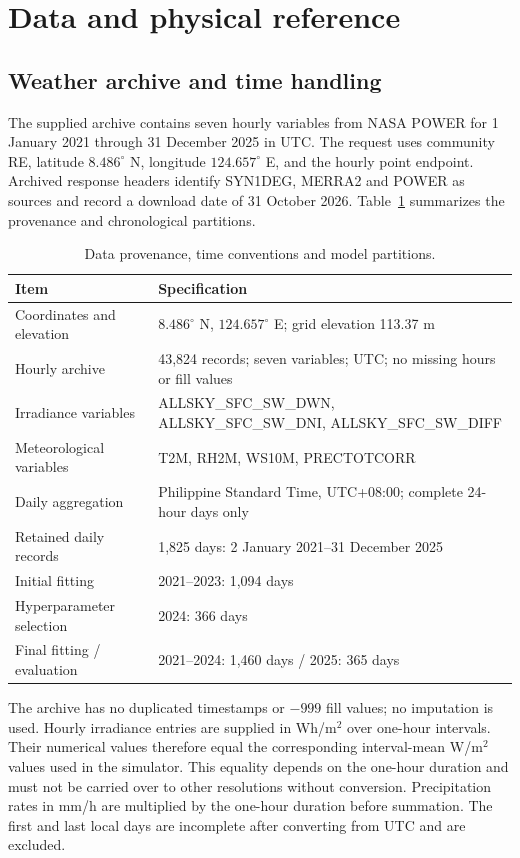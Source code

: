 \documentclass[11pt,a4paper]{article}
\begin{document}
\section{Data and physical reference}
\subsection{Weather archive and time handling}
The supplied archive contains seven hourly variables from NASA POWER for 1 January 2021 through 31 December 2025 in UTC. The request uses community RE, latitude $8.486^{\circ}$ N, longitude $124.657^{\circ}$ E, and the hourly point endpoint. Archived response headers identify SYN1DEG, MERRA2 and POWER as sources and record a download date of 31 October 2026. Table~\ref{tab:data} summarizes the provenance and chronological partitions.
\begin{table}[htbp]\centering\small
\caption{Data provenance, time conventions and model partitions.}\label{tab:data}
\begin{tabularx}{\linewidth}{@{}lX@{}}\toprule
Item & Specification\\\midrule
Coordinates and elevation & $8.486^{\circ}$ N, $124.657^{\circ}$ E; grid elevation 113.37 m\\
Hourly archive & 43,824 records; seven variables; UTC; no missing hours or fill values\\
Irradiance variables & ALLSKY\_SFC\_SW\_DWN, ALLSKY\_SFC\_SW\_DNI, ALLSKY\_SFC\_SW\_DIFF\\
Meteorological variables & T2M, RH2M, WS10M, PRECTOTCORR\\
Daily aggregation & Philippine Standard Time, UTC+08:00; complete 24-hour days only\\
Retained daily records & 1,825 days: 2 January 2021--31 December 2025\\
Initial fitting & 2021--2023: 1,094 days\\
Hyperparameter selection & 2024: 366 days\\
Final fitting / evaluation & 2021--2024: 1,460 days / 2025: 365 days\\\bottomrule
\end{tabularx}\end{table}

The archive has no duplicated timestamps or $-999$ fill values; no imputation is used. Hourly irradiance entries are supplied in Wh/m$^2$ over one-hour intervals. Their numerical values therefore equal the corresponding interval-mean W/m$^2$ values used in the simulator. This equality depends on the one-hour duration and must not be carried over to other resolutions without conversion. Precipitation rates in mm/h are multiplied by the one-hour duration before summation. The first and last local days are incomplete after converting from UTC and are excluded.
\end{document}
